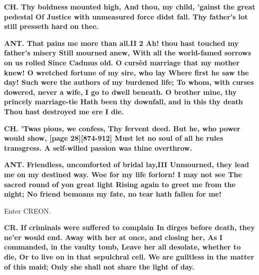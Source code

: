 \documentclass[11pt,letter]{book}
\begin{document}
\par \textbf{CH. Thy boldness mounted high, And thou, my child, ’gainst the great pedestal Of Justice with unmeasured force didst fall. Thy father’s lot still presseth hard on thee.}
\par 

\par \textbf{ANT. That pains me more than all.II 2 Ah! thou hast touched my father’s misery Still mourned anew, With all the world-famed sorrows on us rolled Since Cadmus old. O cursèd marriage that my mother knew! O wretched fortune of my sire, who lay Where first he saw the day! Such were the authors of my burdened life; To whom, with curses dowered, never a wife, I go to dwell beneath. O brother mine, thy princely marriage-tie Hath been thy downfall, and in this thy death Thou hast destroyed me ere I die.}
\par 

\par \textbf{CH. ’Twas pious, we confess, Thy fervent deed. But he, who power would show, [page 28][874-912] Must let no soul of all he rules transgress. A self-willed passion was thine overthrow.}
\par 

\par \textbf{ANT. Friendless, uncomforted of bridal lay,III Unmourned, they lead me on my destined way. Woe for my life forlorn! I may not see The sacred round of yon great light Rising again to greet me from the night; No friend bemoans my fate, no tear hath fallen for me!}
\par 

\par  Enter CREON.

\par \textbf{CR. If criminals were suffered to complain In dirges before death, they ne’er would end. Away with her at once, and closing her, As I commanded, in the vaulty tomb, Leave her all desolate, whether to die, Or to live on in that sepulchral cell. We are guiltless in the matter of this maid; Only she shall not share the light of day.}
\par 
\end{document}
